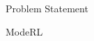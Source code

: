\documentclass[final,11pt]{beamer}
\newlength{\colwidth}
\renewcommand{\mid}{\,|\,}
\newcommand{\modeInd}{\ensuremath{k}}
\newcommand{\modeDesInd}{\ensuremath{\text{des}}}
\newcommand{\modeDes}[1]{\ensuremath{#1^{\modeDesInd}}}
\newcommand{\state}{\ensuremath{\mathbf{x}}}
\newcommand{\modeVar}{\ensuremath{\alpha}}
\newcommand{\timeInd}{\ensuremath{t}}
\newcommand{\TimeInd}{\ensuremath{\MakeUppercase{\timeInd}}}
\newcommand{\dynamicsFunc}{\ensuremath{f}}
\newcommand{\policy}{\ensuremath{\pi}}
\newcommand{\desiredMode}{\ensuremath{\modeInd^{*}}}
\renewcommand{\modeDes}[1]{\ensuremath{#1_{\desiredMode}}}
\newcommand{\desiredStateDomain}{\ensuremath{\modeDes{\stateDomain}}}
\newcommand{\stateDomain}{\ensuremath{\mathcal{S}}}
\newcommand{\controlDomain}{\ensuremath{\mathcal{A}}}
\renewcommand{\state}{\ensuremath{\mathbf{s}}}
\begin{document}
\begin{frame}[t]
\begin{columns}[t]
\begin{column}{\colwidth}
\begin{block}{Problem Statement}





  \end{block}

  \begin{block}{ModeRL}


\end{block}
\end{column}
\end{columns}
\end{frame}
\end{document}
